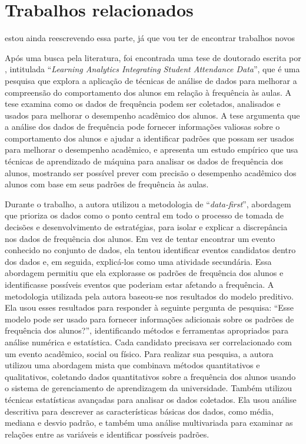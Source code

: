 \chapter{Trabalhos relacionados}


{\color{red}estou ainda reescrevendo essa parte, já que vou ter de encontrar trabalhos novos}

Após uma busca pela literatura, foi encontrada uma tese de doutorado escrita por , intitulada ``\textit{Learning Analytics Integrating Student Attendance Data}'', que é uma pesquisa que explora a aplicação de técnicas de análise de dados para melhorar a compreensão do comportamento dos alunos em relação à frequência às aulas. A tese examina como os dados de frequência podem ser coletados, analisados e usados para melhorar o desempenho acadêmico dos alunos. A tese argumenta que a análise dos dados de frequência pode fornecer informações valiosas sobre o comportamento dos alunos e ajudar a identificar padrões que possam ser usados para melhorar o desempenho acadêmico, e apresenta um estudo empírico que usa técnicas de aprendizado de máquina para analisar os dados de frequência dos alunos, mostrando ser possível prever com precisão o desempenho acadêmico dos alunos com base em seus padrões de frequência às aulas.

Durante o trabalho, a autora utilizou a metodologia de ``\textit{data-first}'', abordagem que prioriza os dados como o ponto central em todo o processo de tomada de decisões e desenvolvimento de estratégias, para isolar e explicar a discrepância nos dados de frequência dos alunos. Em vez de tentar encontrar um evento conhecido no conjunto de dados, ela tentou identificar eventos candidatos dentro dos dados e, em seguida, explicá-los como uma atividade secundária. Essa abordagem permitiu que ela explorasse os padrões de frequência dos alunos e identificasse possíveis eventos que poderiam estar afetando a frequência. A metodologia utilizada pela autora baseou-se nos resultados do modelo preditivo. Ela usou esses resultados para responder à seguinte pergunta de pesquisa:  ``Esse modelo pode ser usado para fornecer informações adicionais sobre os padrões de frequência dos alunos?'', identificando métodos e ferramentas apropriados para análise numérica e estatística. Cada candidato precisava ser correlacionado com um evento acadêmico, social ou físico. Para realizar sua pesquisa, a autora utilizou uma abordagem mista que combinava métodos quantitativos e qualitativos, coletando dados quantitativos sobre a frequência dos alunos usando o sistema de gerenciamento de aprendizagem da universidade. Também utilizou técnicas estatísticas avançadas para analisar os dados coletados. Ela usou análise descritiva para descrever as características básicas dos dados, como média, mediana e desvio padrão, e também uma análise multivariada para examinar as relações entre as variáveis e identificar possíveis padrões.


